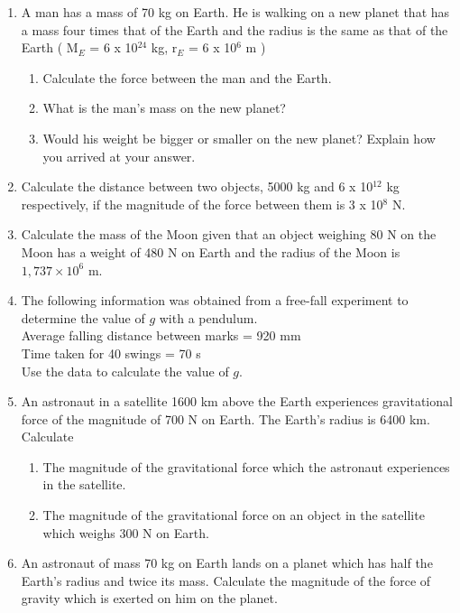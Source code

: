 \begin{eocexercises}{}
\begin{enumerate}
\item {A man has a mass of 70 kg on Earth. He is walking on a new planet that has a mass four times that of the Earth and the radius is the same as that of the Earth ( M$_E$ = 6 x 10$^{24}$ kg, r$_E$ = 6 x 10$^6$ m )
\begin{enumerate}
\item Calculate the force between the man and the Earth.
\item What is the man's mass on the new planet?
\item Would his weight be bigger or smaller on the new planet? Explain how you arrived at your answer.
\end{enumerate}
}

\item {Calculate the distance between two objects, 5000 kg and 6 x 10$^{12}$ kg respectively, if the magnitude of the force between them is 3 x 10$^{8}$ N.	}

\item {Calculate the mass of the Moon given that an object weighing 80 N on the Moon has a weight of 480 N on Earth and the radius of the Moon is $1,737 \times 10^{6}$ m.}

\item {The following information was obtained from a free-fall experiment to determine the value of $g$ with a pendulum.\\
Average falling distance between marks = 920 mm\\
Time taken for 40 swings = 70 s\\
Use the data to calculate the value of $g$.}	%

\item {An astronaut in a satellite 1600 km above the Earth experiences gravitational force of the magnitude of 700 N on Earth.  The Earth's radius is 6400 km.  Calculate
\begin{enumerate}
\item The magnitude of the gravitational force which the astronaut experiences in the satellite.
\item The magnitude of the gravitational force on an object in the satellite which weighs 300 N on Earth.
\end{enumerate}}

\item {An astronaut of mass 70 kg on Earth lands on a planet which has half the Earth's radius and twice its mass.  Calculate the magnitude of the force of gravity which is exerted on him on the planet.}


\end{enumerate}
\end{eocexercises}
